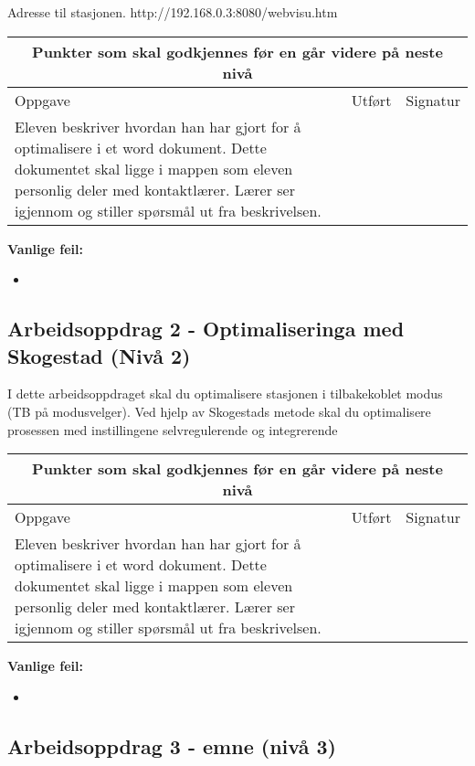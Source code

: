 Adresse til stasjonen. http://192.168.0.3:8080/webvisu.htm


\begin{center} \begin{tabular}{ | m{8cm} | m{1cm}| m{2cm} | } 
\hline
\multicolumn{3}{|c|}{Punkter som skal godkjennes før en går videre på neste nivå} \\
	\hline
	Oppgave	& Utført & Signatur \\ 
	\hline
Eleven beskriver hvordan han har gjort for å optimalisere i et word dokument. Dette dokumentet skal ligge i mappen som eleven personlig deler med kontaktlærer. Lærer ser igjennom og stiller spørsmål ut fra beskrivelsen.& & \\ 
	\hline
\end{tabular}
\end{center}

\textbf{Vanlige feil:}
\begin{itemize}[noitemsep]
	\item 
\end{itemize}
\newpage
\subsection*{Arbeidsoppdrag 2 - Optimaliseringa med Skogestad (Nivå 2)}

I dette arbeidsoppdraget skal du optimalisere stasjonen i tilbakekoblet modus (TB på modusvelger). Ved hjelp av Skogestads metode skal du optimalisere prosessen med instillingene selvregulerende og integrerende

\begin{center}
\begin{tabular}{ | m{8cm} | m{1cm}| m{2cm} | } 
\hline
\multicolumn{3}{|c|}{Punkter som skal godkjennes før en går videre på neste nivå} \\
	\hline
	Oppgave	& Utført & Signatur \\ 
	\hline
Eleven beskriver hvordan han har gjort for å optimalisere i et word dokument. Dette dokumentet skal ligge i mappen som eleven personlig deler med kontaktlærer. Lærer ser igjennom og stiller spørsmål ut fra beskrivelsen.& & \\ 
	\hline
\end{tabular}
\end{center}
\textbf{Vanlige feil:}
\begin{itemize}[noitemsep]
	\item 
\end{itemize}
\newpage
\subsection*{Arbeidsoppdrag 3 - emne (nivå 3)}

